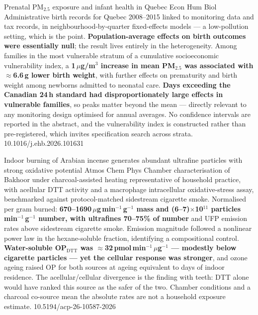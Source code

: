 \documentclass[10pt]{article}
\begin{document}
{Prenatal PM$_{2.5}$ exposure and infant health in Quebec}
{Econ Hum Biol}
{Administrative birth records for Quebec 2008--2015 linked to monitoring data and tax
records, in neighbourhood-by-quarter fixed-effects models --- a low-pollution setting,
which is the point. \textbf{Population-average effects on birth outcomes were essentially
null}; the result lives entirely in the heterogeneity. Among families in the most
vulnerable stratum of a cumulative socioeconomic vulnerability index, a
\textbf{1\,$\mu$g/m$^3$ increase in mean PM$_{2.5}$ was associated with $\approx$6.6\,g
lower birth weight}, with further effects on prematurity and birth weight among newborns
admitted to neonatal care. \textbf{Days exceeding the Canadian 24\,h standard had
disproportionately large effects in vulnerable families}, so peaks matter beyond the
mean --- directly relevant to any monitoring design optimised for annual averages. No
confidence intervals are reported in the abstract, and the vulnerability index is
constructed rather than pre-registered, which invites specification search across strata.}
{10.1016/j.ehb.2026.101631}


{Indoor burning of Arabian incense generates abundant ultrafine particles with strong
oxidative potential}
{Atmos Chem Phys}
{Chamber characterisation of Bakhoor under charcoal-assisted heating representative of
household practice, with acellular DTT activity and a macrophage intracellular
oxidative-stress assay, benchmarked against protocol-matched sidestream cigarette smoke.
Normalised per gram burned: \textbf{670--1690\,$\mu$g\,min$^{-1}$\,g$^{-1}$ mass and
(6--7)$\times$10$^{11}$ particles\,min$^{-1}$\,g$^{-1}$ number, with ultrafines
70--75\% of number} and UFP emission rates above sidestream cigarette smoke. Emission
magnitude followed a nonlinear power law in the hexane-soluble fraction, identifying a
compositional control. \textbf{Water-soluble OP$_{\mathrm{DTT}}$ was
$\approx$32\,pmol\,min$^{-1}$\,$\mu$g$^{-1}$ --- modestly below cigarette particles ---
yet the cellular response was stronger}, and ozone ageing raised OP for both sources at
ageing equivalent to days of indoor residence. The acellular/cellular divergence is the
finding with teeth: DTT alone would have ranked this source as the safer of the two.
Chamber conditions and a charcoal co-source mean the absolute rates are not a household
exposure estimate.}
{10.5194/acp-26-10587-2026}
\end{document}
